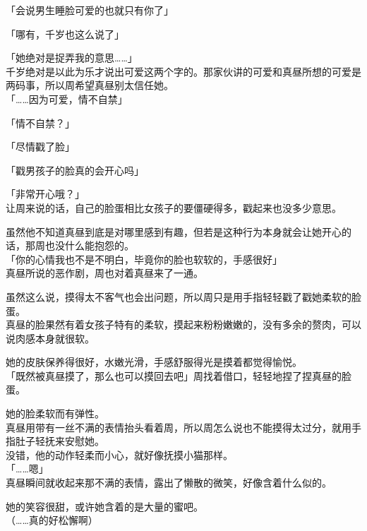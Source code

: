 「会说男生睡脸可爱的也就只有你了」

「哪有，千岁也这么说了」

「她绝对是捉弄我的意思……」\\

千岁绝对是以此为乐才说出可爱这两个字的。那家伙讲的可爱和真昼所想的可爱是两码事，所以周希望真昼别太信任她。\\

「……因为可爱，情不自禁」

「情不自禁？」

「尽情戳了脸」

「戳男孩子的脸真的会开心吗」

「非常开心哦？」\\

让周来说的话，自己的脸蛋相比女孩子的要僵硬得多，戳起来也没多少意思。

虽然他不知道真昼到底是对哪里感到有趣，但若是这种行为本身就会让她开心的话，那周也没什么能抱怨的。\\

「你的心情我也不是不明白，毕竟你的脸也软软的，手感很好」\\

真昼所说的恶作剧，周也对着真昼来了一通。

虽然这么说，摸得太不客气也会出问题，所以周只是用手指轻轻戳了戳她柔软的脸蛋。\\

真昼的脸果然有着女孩子特有的柔软，摸起来粉粉嫩嫩的，没有多余的赘肉，可以说肉感本身就很软。

她的皮肤保养得很好，水嫩光滑，手感舒服得光是摸着都觉得愉悦。\\

「既然被真昼摸了，那么也可以摸回去吧」周找着借口，轻轻地捏了捏真昼的脸蛋。

她的脸柔软而有弹性。\\

真昼用带有一丝不满的表情抬头看着周，所以周怎么说也不能摸得太过分，就用手指肚子轻抚来安慰她。\\

没错，他的动作轻柔而小心，就好像抚摸小猫那样。\\

「……嗯」\\

真昼瞬间就收起来那不满的表情，露出了懒散的微笑，好像含着什么似的。

她的笑容很甜，或许她含着的是大量的蜜吧。\\

（……真的好松懈啊）\\

